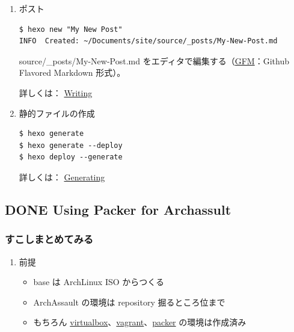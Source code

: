 \documentclass[11pt]{article}
\begin{document}
\begin{enumerate}
\begin{verbatim}
$ git clone https://github.com/joyceim/hexo-theme-apollo.git themes/apollo
\end{verbatim}

参考：\_config.ymlの languageとthemes 部分

\begin{verbatim}
language: defualt
...
theme: apollo
\end{verbatim}
\item ポスト
\label{sec:org9e0c7cb}
\begin{verbatim}
$ hexo new "My New Post"
INFO  Created: ~/Documents/site/source/_posts/My-New-Post.md
\end{verbatim}

source/\_posts/My-New-Post.md をエディタで編集する（\href{https://help.github.com/articles/github-flavored-markdown/}{GFM}：Github Flavored Markdown 形式）。

詳しくは： \href{http://hexo.io/docs/writing.html}{Writing}
\item 静的ファイルの作成
\label{sec:orgd2a7356}
\begin{verbatim}
$ hexo generate
$ hexo generate --deploy
$ hexo deploy --generate
\end{verbatim}

詳しくは： \href{http://hexo.io/docs/generating.html}{Generating}
\end{enumerate}
\subsection{{\bfseries\sffamily DONE} Using Packer for Archassult}
\label{sec:org90dd33e}
\subsubsection{すこしまとめてみる}
\label{sec:org9001b3c}
\begin{enumerate}
\item 前提
\label{sec:org7194231}
\begin{itemize}
\item base は ArchLinux ISO からつくる
\item ArchAssault の環境は repository 掘るところ位まで
\item もちろん
\href{https://www.virtualbox.org}{virtualbox}、\href{https://www.vagrantup.com}{vagrant}、\href{https://www.vagrantup.com}{packer}
の環境は作成済み
\end{itemize}
\end{enumerate}
\end{document}
